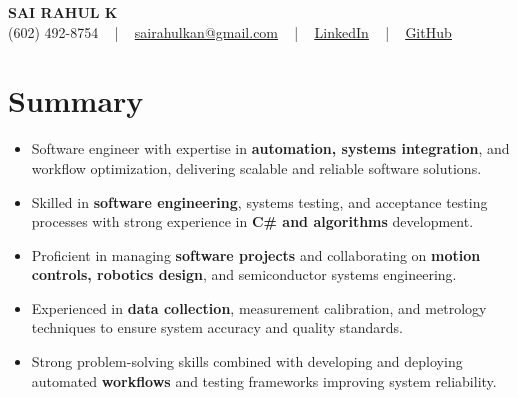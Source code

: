 \documentclass[letterpaper,11pt]{article}
\newcommand{\resumeItem}[1]{
  \item\footnotesize{
    {#1 \vspace{-2pt}}
  }
}
\newcommand{\resumeItemListStart}{\begin{itemize}[leftmargin=*]}
\newcommand{\resumeItemListEnd}{\end{itemize}\vspace{-5pt}}
\begin{document}
\begin{center}
    {\fontsize{14pt}{12pt}\selectfont \textbf{\MakeUppercase{Sai Rahul K}}}\\ \vspace{2pt}
    \fontsize{10pt}{12pt}\selectfont (602) 492-8754 ~ | ~ \href{mailto:sairahulkan@gmail.com}{sairahulkan@gmail.com} ~ | ~
    \href{https://www.linkedin.com/in/rq123/}{\color{blue}\underline{LinkedIn}} ~ | ~
    \href{https://github.com/kanrahuldo}{\color{blue}\underline{GitHub}}~
    \vspace{-8pt}
\end{center}

\section{Summary}
\fontsize{9pt}{10pt}\selectfont
\resumeItemListStart
    \resumeItem{Software engineer with expertise in \textbf{automation, systems integration}, and workflow optimization, delivering scalable and reliable software solutions.}
    \resumeItem{Skilled in \textbf{software engineering}, systems testing, and acceptance testing processes with strong experience in \textbf{C\# and algorithms} development.}
    \resumeItem{Proficient in managing \textbf{software projects} and collaborating on \textbf{motion controls, robotics design}, and semiconductor systems engineering.}
    \resumeItem{Experienced in \textbf{data collection}, measurement calibration, and metrology techniques to ensure system accuracy and quality standards.}
    \resumeItem{Strong problem-solving skills combined with developing and deploying automated \textbf{workflows} and testing frameworks improving system reliability.}
\resumeItemListEnd
\vspace{-6pt}
\end{document}
